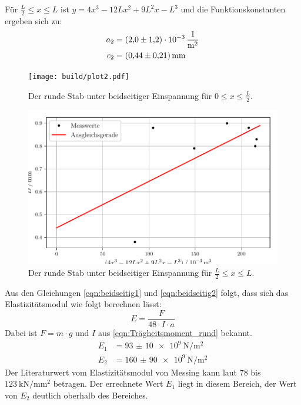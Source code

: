 Für $\frac{L}{2} \leq x \leq L$ ist $y = 4x^3 -12Lx^2 + 9L^2x -L^3$ und die Funktionskonstanten ergeben sich zu:
\begin{align*}
  a_2 &= \SI{2.0(12)e-3}{\per\metre\squared}\\
  c_2 &= \SI{0.44 \pm 0.21}{\milli\meter}\\
\end{align*}
\begin{figure}
  \caption{Der runde Stab unter beidseitiger Einspannung für $0 \leq x \leq \frac{L}{2}$.}
  \texttt{[image: build/plot2.pdf]}
\end{figure}
\begin{figure}
  \centering
  \includegraphics[width= \textwidth]{plot22.pdf}
  \caption{Der runde Stab unter beidseitiger Einspannung für $\frac{L}{2} \leq x \leq L$.}
  \label{fig:rund_beid2}
\end{figure}
Aus den Gleichungen \eqref{eqn:beidseitig1} und \eqref{eqn:beidseitig2} folgt, dass sich das Elastizitätsmodul wie folgt berechnen lässt:
\begin{equation*}
  E = \frac{F}{48 \cdot I \cdot a}
\end{equation*}
Dabei ist $F = m\cdot g$ und $I$ aus \eqref{eqn:Trägheitsmoment_rund} bekannt.
\begin{align*}
  E_1 &= \SI{93(10)e9}{\newton\per\metre\squared}\\
  E_2 &= \SI{160(90)e9}{\newton\per\metre\squared}
\end{align*}
Der Literaturwert vom Elastizitätsmodul von Messing kann laut \cite{chemie.de} $\num{78}$ bis $\SI{123}{\kilo\newton\per\milli\metre\squared}$ betragen. 
Der errechnete Wert $E_1$ liegt in diesem Bereich, der Wert von $E_2$ deutlich oberhalb des Bereiches. 